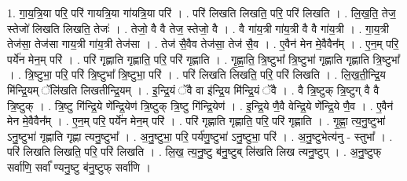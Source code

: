\documentclass[17pt]{extarticle}
\begin{document}
1. गा॒य॒त्रि॒या परि॒ परि॑ गायत्रि॒या गा॑यत्रि॒या परि॑ । . परि॑ लिखति लिखति॒ परि॒ परि॑ लिखति । . लि॒ख॒ति॒ तेज॒ स्तेजो॑ लिखति लिखति॒ तेजः॑ । . तेजो॒ वै वै तेज॒ स्तेजो॒ वै । . वै गा॑य॒त्री गा॑य॒त्री वै वै गा॑य॒त्री । . गा॒य॒त्री तेज॑सा॒ तेज॑सा गाय॒त्री गा॑य॒त्री तेज॑सा । . तेज॑ सै॒वैव तेज॑सा॒ तेज॑ सै॒व । . ए॒वैन॑ मेन मे॒वैवैन᳚म् । . ए॒न॒म् परि॒ पर्ये॑न मेन॒म् परि॑ । . परि॑ गृह्णाति गृह्णाति॒ परि॒ परि॑ गृह्णाति । . गृ॒ह्णा॒ति॒ त्रि॒ष्टुभा᳚ त्रि॒ष्टुभा॑ गृह्णाति गृह्णाति त्रि॒ष्टुभा᳚ । . त्रि॒ष्टुभा॒ परि॒ परि॑ त्रि॒ष्टुभा᳚ त्रि॒ष्टुभा॒ परि॑ । . परि॑ लिखति लिखति॒ परि॒ परि॑ लिखति । . लि॒ख॒ती॒न्द्रि॒य मि॑न्द्रि॒यम् ॅलि॑खति लिखतीन्द्रि॒यम् । . इ॒न्द्रि॒यं ॅवै वा इ॑न्द्रि॒य मि॑न्द्रि॒यं ॅवै । . वै त्रि॒ष्टुक् त्रि॒ष्टुग् वै वै त्रि॒ष्टुक् । . त्रि॒ष्टु गि॑न्द्रि॒ये णे᳚न्द्रि॒येण॑ त्रि॒ष्टुक् त्रि॒ष्टु गि॑न्द्रि॒येण॑ । . इ॒न्द्रि॒ये णै॒वै वेन्द्रि॒ये णे᳚न्द्रि॒ये णै॒व । . ए॒वैन॑ मेन मे॒वैवैन᳚म् । . ए॒न॒म् परि॒ पर्ये॑न मेन॒म् परि॑ । . परि॑ गृह्णाति गृह्णाति॒ परि॒ परि॑ गृह्णाति । . गृ॒ह्णा॒ त्य॒नु॒ष्टुभा॑ ऽनु॒ष्टुभा॑ गृह्णाति गृह्णा त्यनु॒ष्टुभा᳚ । . अ॒नु॒ष्टुभा॒ परि॒ पर्य॑णु॒ष्टुभा॑ ऽनु॒ष्टुभा॒ परि॑ । . अ॒नु॒ष्टुभेत्य॑नु - स्तुभा᳚ । . परि॑ लिखति लिखति॒ परि॒ परि॑ लिखति । . लि॒ख॒ त्य॒नु॒ष्टु ब॑नु॒ष्टुब् लि॑खति लिख त्यनु॒ष्टुप् । . अ॒नु॒ष्टुफ् सर्वा॑णि॒ सर्वा᳚ ण्यनु॒ष्टु ब॑नु॒ष्टुफ् सर्वा॑णि । \newline
\end{document}
